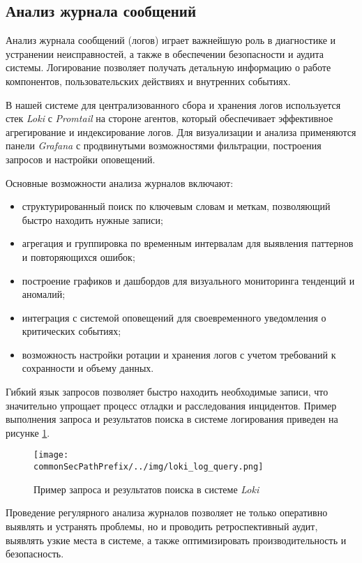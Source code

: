 \subsection{Анализ журнала сообщений}

Анализ журнала сообщений (логов) играет важнейшую роль в диагностике и устранении неисправностей, а также в обеспечении безопасности и аудита системы. Логирование позволяет получать детальную информацию о работе компонентов, пользовательских действиях и внутренних событиях.

В нашей системе для централизованного сбора и хранения логов используется стек \textit{Loki} с \textit{Promtail} на стороне агентов, который обеспечивает эффективное агрегирование и индексирование логов. Для визуализации и анализа применяются панели \textit{Grafana} с продвинутыми возможностями фильтрации, построения запросов и настройки оповещений.

Основные возможности анализа журналов включают:

\begin{itemize}
    \item структурированный поиск по ключевым словам и меткам, позволяющий быстро находить нужные записи;
    \item агрегация и группировка по временным интервалам для выявления паттернов и повторяющихся ошибок;
    \item построение графиков и дашбордов для визуального мониторинга тенденций и аномалий;
    \item интеграция с системой оповещений для своевременного уведомления о критических событиях;
    \item возможность настройки ротации и хранения логов с учетом требований к сохранности и объему данных.
\end{itemize}


Гибкий язык запросов позволяет быстро находить необходимые записи, что значительно упрощает процесс отладки и расследования инцидентов. Пример выполнения запроса и результатов поиска в системе логирования приведен на рисунке \ref{fig:loki_log_query}.

\begin{figure}[ht]
    \centering
    \texttt{[image: \\commonSecPathPrefix/../img/loki\_log\_query.png]}
    \caption{Пример запроса и результатов поиска в системе \textit{Loki}}
    \label{fig:loki_log_query}
\end{figure}

Проведение регулярного анализа журналов позволяет не только оперативно выявлять и устранять проблемы, но и проводить ретроспективный аудит, выявлять узкие места в системе, а также оптимизировать производительность и безопасность.

